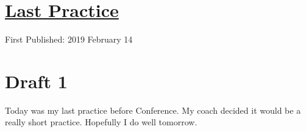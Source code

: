 \documentclass[12pt]{article}[titlepage]
\newcommand{\1}{\={a}}
\newcommand{\2}{\={e}}
\newcommand{\3}{\={\i}}
\newcommand{\4}{\=o}
\newcommand{\5}{\=u}
\newcommand{\6}{\={A}}
\renewcommand{\,}{\textsuperscript{,}}
\begin{document}
\doublespacing
\section{\href{last-practice.html}{Last Practice}}
First Published: 2019 February 14
\section{Draft 1}
Today was my last practice before Conference.
My coach decided it would be a really short practice.
Hopefully I do well tomorrow.
\end{document}

